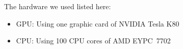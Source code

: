 The hardware we used listed here: 
\begin{center}
\begin{itemize}
    \item GPU: Using one graphic card of NVIDIA\textsuperscript{\textregistered} Tesla\textsuperscript{\textregistered} K80
    \item CPU: Using 100 CPU cores of AMD EYPC\texttrademark\ 7702
\end{itemize}
\end{center}


